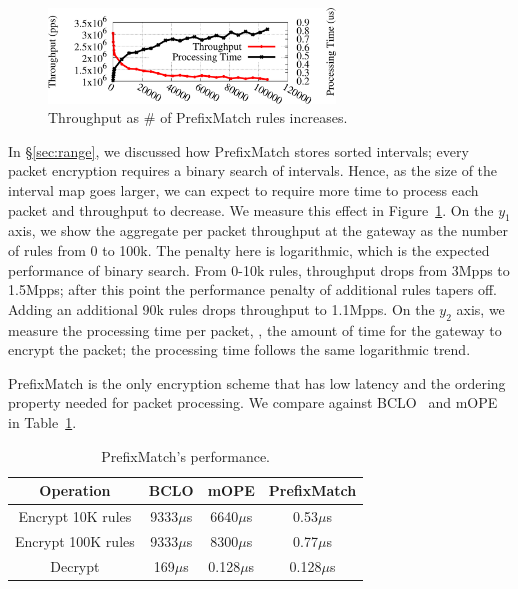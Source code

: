 \begin{figure}[t]
  \vspace{-10pt}
  \centering
  \includegraphics[width=3in]{fig/xputrange}
  \caption[]{\label{fig:xputrange} Throughput as \# of PrefixMatch rules increases.}
\end{figure}

In \S\ref{sec:range}, we discussed how PrefixMatch stores sorted intervals; every packet encryption requires a binary search of intervals. Hence, as the size of the interval map goes larger, we can expect to require more time to process each packet and throughput to decrease. We measure this effect in Figure~\ref{fig:xputrange}. 
On the $y_1$ axis, we show the aggregate per packet throughput at the gateway as the number of rules from 0 to 100k. The penalty here is logarithmic, which is the expected performance of binary search. From 0-10k rules, throughput drops from 3Mpps to 1.5Mpps; after this point the performance penalty of additional rules tapers off. Adding an additional 90k rules drops throughput to 1.1Mpps.
On the $y_2$ axis, we measure the processing time per packet, \ie{}, the amount of time for the gateway to encrypt the packet; the processing time follows the same logarithmic trend.

PrefixMatch is the only encryption scheme that has low latency and the ordering property needed for packet processing.
We compare against BCLO~\cite{boldyreva:ope} and mOPE~\cite{popa:mope} in Table~\ref{tab:opecomp}.

\begin{table}[h]

\centering
\small
\begin{tabular}{c|c|c|c}
{\bf Operation}&{\bf BCLO}&{\bf mOPE}&{\bf PrefixMatch}\\
\hline
\hline
Encrypt 10K rules&9333$\mu$s&6640$\mu$s&0.53$\mu$s\\
\hline
Encrypt 100K rules&9333$\mu$s&8300$\mu$s&0.77$\mu$s\\
\hline
Decrypt&169$\mu$s&0.128$\mu$s&0.128$\mu$s\\
\hline
\end{tabular}

\caption{PrefixMatch's performance.
\label{tab:opecomp} }
\end{table}

